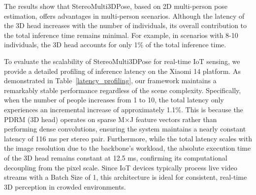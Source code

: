 \documentclass[journal]{IEEEtran}
\begin{document}
The results show that StereoMulti3DPose, based on 2D multi-person pose estimation, offers advantages in multi-person scenarios. Although the latency of the 3D head increases with the number of individuals, its overall contribution to the total inference time remains minimal. For example, in scenarios with 8-10 individuals, the 3D head accounts for only 1\% of the total inference time.
\begin{table}[htbp]
\centering
\caption{Detailed latency profiling of StereoMulti3DPose on Xiaomi 14. The 3D head (PDRM) exhibits minimal incremental cost despite scaling person count or resolution.}
\label{latency_profiling}
\end{table}

To evaluate the scalability of StereoMulti3DPose for real-time IoT sensing, we provide a detailed profiling of inference latency on the Xiaomi 14 platform. As demonstrated in Table~\ref{latency_profiling}, our framework maintains a remarkably stable performance regardless of the scene complexity. Specifically, when the number of people increases from 1 to 10, the total latency only experiences an incremental increase of approximately 1.1\%. This is because the PDRM (3D head) operates on sparse M×J feature vectors rather than performing dense convolutions, ensuring the system maintains a nearly constant latency of 116 ms per stereo pair. Furthermore, while the total latency scales with the image resolution due to the backbone's workload, the absolute execution time of the 3D head remains constant at 12.5 ms, confirming its computational decoupling from the pixel scale. Since IoT devices typically process live video streams with a Batch Size of 1, this architecture is ideal for consistent, real-time 3D perception in crowded environments.
\end{document}
